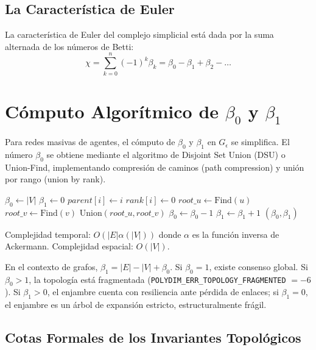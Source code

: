 \subsection{La Característica de Euler}
La característica de Euler del complejo simplicial está dada por la suma alternada de los números de Betti:
\begin{equation}
    \chi = \sum_{k=0}^{n} (-1)^k \beta_k = \beta_0 - \beta_1 + \beta_2 - \dots
\end{equation}

\section{Cómputo Algorítmico de $\beta_0$ y $\beta_1$}
Para redes masivas de agentes, el cómputo de $\beta_0$ y $\beta_1$ en $G_\epsilon$ se simplifica. El número $\beta_0$ se obtiene mediante el algoritmo de Disjoint Set Union (DSU) o Union-Find, implementando compresión de caminos (path compression) y unión por rango (union by rank).

\begin{algorithm}
\caption{Algoritmo DSU para Betti-0 y Betti-1}
\begin{algorithmic}[1]
    \State $\beta_0 \gets |V|$
    \State $\beta_1 \gets 0$
        \State $parent[i] \gets i$
        \State $rank[i] \gets 0$
    \EndFor
        \State $root\_u \gets \text{Find}(u)$
        \State $root\_v \gets \text{Find}(v)$
            \State $\text{Union}(root\_u, root\_v)$
            \State $\beta_0 \gets \beta_0 - 1$
        \Else
            \State $\beta_1 \gets \beta_1 + 1$
        \EndIf
    \EndFor
    \State \Return $(\beta_0, \beta_1)$
\EndProcedure
\end{algorithmic}
\end{algorithm}
Complejidad temporal: $O(|E| \alpha(|V|))$ donde $\alpha$ es la función inversa de Ackermann. Complejidad espacial: $O(|V|)$.

En el contexto de grafos, $\beta_1 = |E| - |V| + \beta_0$. Si $\beta_0 = 1$, existe consenso global. Si $\beta_0 > 1$, la topología está fragmentada (\texttt{POLYDIM\_ERR\_TOPOLOGY\_FRAGMENTED} $=-6$). Si $\beta_1 > 0$, el enjambre cuenta con resiliencia ante pérdida de enlaces; si $\beta_1 = 0$, el enjambre es un árbol de expansión estricto, estructuralmente frágil.

\subsection{Cotas Formales de los Invariantes Topológicos}

